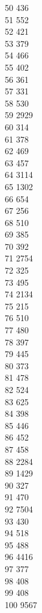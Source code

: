 { 50	436 \\
 51	552 \\
 52	421 \\
 53	379 \\
 54	466 \\
 55	402 \\
 56	361 \\
 57	331 \\
 58	530 \\
 59	2929 \\
 60	314 \\
 61	378 \\
 62	469 \\
 63	457 \\
 64	3114 \\
 65	1302 \\
 66	654 \\
 67	256 \\
 68	510 \\
 69	385 \\
 70	392 \\
 71	2754 \\
 72	325 \\
 73	495 \\
 74	2134 \\
 75	215 \\
 76	510 \\
 77	480 \\
 78	397 \\
 79	445 \\
 80	373 \\
 81	478 \\
 82	524 \\
 83	625 \\
 84	398 \\
 85	446 \\
 86	452 \\
 87	458 \\
 88	2284 \\
 89	1429 \\
 90	327 \\
 91	470 \\
 92	7504 \\
 93	430 \\
 94	518 \\
 95	488 \\
 96	4416 \\
 97	377 \\
 98	408 \\
 99	408 \\
 100	9567 \\
}
